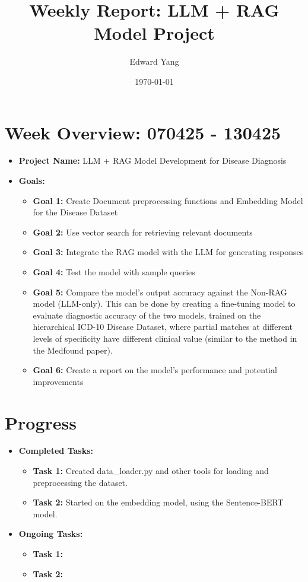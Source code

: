 \documentclass[12pt]{article}
\title{Weekly Report: LLM + RAG Model Project}
\author{Edward Yang}
\date{\today}
\begin{document}
\maketitle

\section*{Week Overview: 070425 - 130425}
\begin{itemize}
    \item \textbf{Project Name:} LLM + RAG Model Development for Disease Diagnosis
    \item \textbf{Goals:}
    \begin{itemize}[leftmargin=*]
        \item \textbf{Goal 1:} Create Document preprocessing functions and Embedding Model for the Disease Dataset
        \item \textbf{Goal 2:} Use vector search for retrieving relevant documents
        \item \textbf{Goal 3:} Integrate the RAG model with the LLM for generating responses
        \item \textbf{Goal 4:} Test the model with sample queries
        \item \textbf{Goal 5:} Compare the model's output accuracy against the Non-RAG model (LLM-only). This can be done by creating a fine-tuning model to evaluate diagnostic accuracy of the two models, trained on the hierarchical ICD-10 Disease Dataset, where partial matches at different levels of specificity have different clinical value (similar to the method in the Medfound paper).
        \item \textbf{Goal 6:} Create a report on the model's performance and potential improvements
    \end{itemize}
\end{itemize}

\section*{Progress}
\begin{itemize}
    \item \textbf{Completed Tasks:}
    \begin{itemize}[leftmargin=*]
        \item \textbf{Task 1:} Created data\_loader.py and other tools for loading and preprocessing the dataset.
        \item \textbf{Task 2:} Started on the embedding model, using the Sentence-BERT model.
    \end{itemize}
    \item \textbf{Ongoing Tasks:}
    \begin{itemize}[leftmargin=*]
        \item \textbf{Task 1:} 
        \item \textbf{Task 2:} 
    \end{itemize}
\end{itemize}
\end{document}
